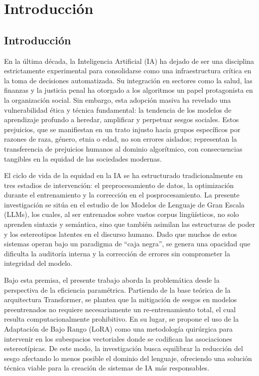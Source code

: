 \documentclass[12pt,a4paper]{report}
\begin{document}
\clearpage

\chapter{Introducción}
\label{chap:introduccion}

\section{Introducción}
\label{sec:introduccion}

En la última década, la Inteligencia Artificial (IA) ha dejado de ser una disciplina estrictamente experimental para consolidarse como una infraestructura crítica en la toma de decisiones automatizada. Su integración en sectores como la salud, las finanzas y la justicia penal ha otorgado a los algoritmos un papel protagonista en la organización social. Sin embargo, esta adopción masiva ha revelado una vulnerabilidad ética y técnica fundamental: la tendencia de los modelos de aprendizaje profundo a heredar, amplificar y perpetuar sesgos sociales. Estos prejuicios, que se manifiestan en un trato injusto hacia grupos específicos por razones de raza, género, etnia o edad, no son errores aislados; representan la transferencia de prejuicios humanos al dominio algorítmico, con consecuencias tangibles en la equidad de las sociedades modernas.

El ciclo de vida de la equidad en la IA se ha estructurado tradicionalmente en tres estadios de intervención: el preprocesamiento de datos, la optimización durante el entrenamiento y la corrección en el posprocesamiento. La presente investigación se sitúa en el estudio de los Modelos de Lenguaje de Gran Escala (LLMs), los cuales, al ser entrenados sobre vastos corpus lingüísticos, no solo aprenden sintaxis y semántica, sino que también asimilan las estructuras de poder y los estereotipos latentes en el discurso humano. Dado que muchos de estos sistemas operan bajo un paradigma de ``caja negra'', se genera una opacidad que dificulta la auditoría interna y la corrección de errores sin comprometer la integridad del modelo.



Bajo esta premisa, el presente trabajo aborda la problemática desde la perspectiva de la eficiencia paramétrica. 
Partiendo de la base teórica de la arquitectura Transformer, se plantea que la mitigación de sesgos en modelos preentrenados 
no requiere necesariamente un re-entrenamiento total, el cual resulta computacionalmente prohibitivo. En su lugar, se propone 
el uso de la Adaptación de Bajo Rango (LoRA) como una metodología quirúrgica para intervenir en los subespacios vectoriales donde 
se codifican las asociaciones estereotípicas. De este modo, la investigación busca equilibrar la reducción del sesgo afectando lo menos 
posible el dominio del lenguaje, ofreciendo una solución técnica viable para la creación de sistemas de IA más responsables.
\end{document}
